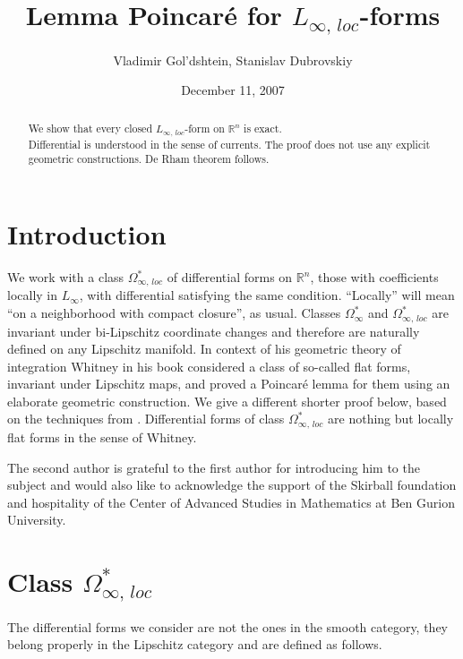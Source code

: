 \documentclass{amsart}%
\title{Lemma Poincar\'e for $L_{\infty,\,loc}$-forms}
\author{Vladimir Gol'dshtein, Stanislav Dubrovskiy}
\date{December 11, 2007}
\begin{document}
\maketitle

\begin{abstract}
We show that every closed $L_{\infty,\,loc}$-form on
$\mathbb{R}^{n}$ is exact.\\Differential is understood in the
sense of currents. The proof does not use any explicit geometric
constructions. De Rham theorem follows.
\end{abstract}


\section{Introduction}
We work with a class $\Omega^{*}_{\infty,\,loc}$ of differential
forms on $\mathbb{R}^{n}$, those with coefficients locally in
$L_{\infty}$, with differential satisfying the same condition.
``Locally'' will mean ``on a neighborhood with compact closure'',
as usual. Classes $\Omega^{*}_{\infty}$ and
$\Omega^{*}_{\infty,\,loc}$ are invariant under bi-Lipschitz
coordinate changes and therefore are naturally defined on any
Lipschitz manifold. In context of his geometric theory of
integration Whitney in his book \cite{W} considered a class of
so-called flat forms, invariant under Lipschitz maps, and proved a
Poincar\'e lemma for them \cite[Th IX.12A]{W} using an elaborate
geometric construction.  %
We give a different shorter proof below, based on the techniques
from \cite{GKS}. %
Differential forms of class $\Omega^{*}_{\infty,\,loc}$ are
nothing but locally flat forms in the sense of Whitney.

The second author is grateful to the first author for introducing
him to the subject and would also like to acknowledge the support
of the Skirball foundation and hospitality of the Center of
Advanced Studies in Mathematics at Ben Gurion University.

\section{Class $\Omega^{*}_{\infty,\,loc}$}
The differential forms we consider are not the ones in the smooth
category, they belong properly in the Lipschitz category and are
defined as follows.
\end{document}

